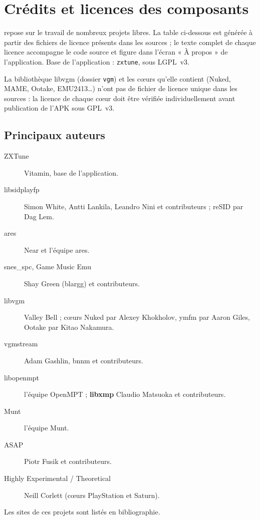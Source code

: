 \chapter{Crédits et licences des composants}\label{chap:credits}
\soft{} repose sur le travail de nombreux projets libres. La table ci-dessous est générée à partir des fichiers de
licence présents dans les sources ; le texte complet de chaque licence accompagne le code source et figure dans
l'écran « À propos » de l'application.
Base de l'application : \texttt{zxtune}, sous LGPL~v3.

La bibliothèque libvgm (dossier \texttt{vgm}) et les cœurs qu'elle contient (Nuked, MAME, Ootake, EMU2413\dots)
n'ont pas de fichier de licence unique dans les sources : la licence de chaque cœur doit être vérifiée
individuellement avant publication de l'APK sous GPL~v3.

\section*{Principaux auteurs}
\begin{description}
  \item[ZXTune] Vitamin, base de l'application.
  \item[libsidplayfp] Simon White, Antti Lankila, Leandro Nini et contributeurs ; reSID par Dag Lem.
  \item[ares] Near et l'équipe ares.
  \item[snes\_spc, Game Music Emu] Shay Green (blargg) et contributeurs.
  \item[libvgm] Valley Bell ; cœurs Nuked par Alexey Khokholov, ymfm par Aaron Giles, Ootake par Kitao Nakamura.
  \item[vgmstream] Adam Gashlin, bnnm et contributeurs.
  \item[libopenmpt] l'équipe OpenMPT ; \textbf{libxmp} Claudio Matsuoka et contributeurs.
  \item[Munt] l'équipe Munt.
  \item[ASAP] Piotr Fusik et contributeurs.
  \item[Highly Experimental / Theoretical] Neill Corlett (cœurs PlayStation et Saturn).
\end{description}
Les sites de ces projets sont listés en bibliographie.
